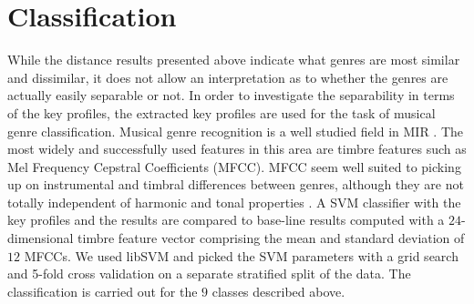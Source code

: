 \documentclass{article}
\begin{document}
\section{Classification}\label{sec:classification}
While the distance results presented above indicate what genres are most similar and dissimilar, it does not allow an interpretation as to whether the genres are actually easily separable or not. In order to investigate the separability in terms of the key profiles, the extracted key profiles are used for the task of musical genre classification. 
Musical genre recognition is a well studied field in MIR \cite{fu_survey_2011}. The most widely and successfully used features in this area are timbre features such as Mel Frequency Cepstral Coefficients (MFCC). MFCC seem well suited to picking up on instrumental and timbral differences between genres, although they are not totally independent of harmonic and tonal properties \cite{li_genre_2011}.
A SVM classifier with the key profiles and the results are compared to base-line results computed with a $24$-dimensional timbre feature vector comprising the mean and standard deviation of $12$ MFCCs. %
We used libSVM  \cite{chang_libsvm:_2011} and picked the SVM parameters with a grid search and 5-fold cross validation on a separate stratified split of the data. The classification is carried out for the $9$ classes described above.
\end{document}
